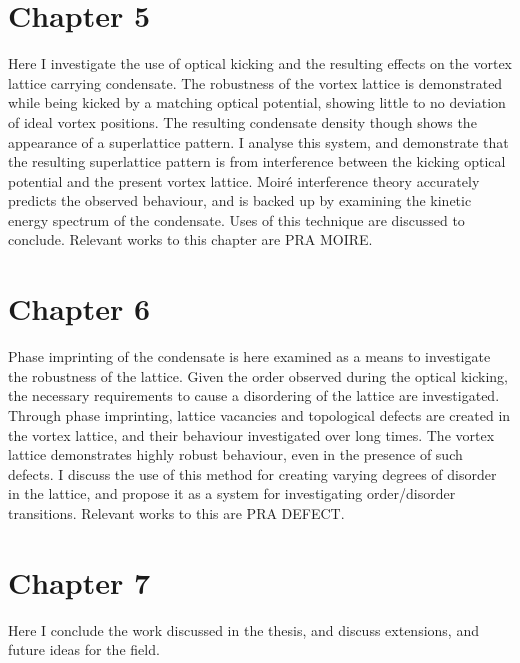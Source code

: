 \section{Chapter 5}
Here I investigate the use of optical kicking and the resulting effects on the vortex lattice carrying condensate. The robustness of the vortex lattice is demonstrated while being kicked by a matching optical potential, showing little to no deviation of ideal vortex positions. The resulting condensate density though shows the appearance of a superlattice pattern. I analyse this system, and demonstrate that the resulting superlattice pattern is from interference between the kicking optical potential and the present vortex lattice. Moir\'e interference theory accurately predicts the observed behaviour, and is backed up by examining the kinetic energy spectrum of the condensate. Uses of this technique are discussed to conclude. Relevant works to this chapter are PRA MOIRE.

\section{Chapter 6}
Phase imprinting of the condensate is here examined as a means to investigate the robustness of the lattice. Given the order observed during the optical kicking, the necessary requirements to cause a disordering of the lattice are investigated. Through phase imprinting, lattice vacancies and topological defects are created in the vortex lattice, and their behaviour investigated over long times. The vortex lattice demonstrates highly robust behaviour, even in the presence of such defects. I discuss the use of this method for creating varying degrees of disorder in the lattice, and propose it as a system for investigating order/disorder transitions. Relevant works to this are PRA DEFECT.

\section{Chapter 7}
Here I conclude the work discussed in the thesis, and discuss extensions, and future ideas for the field.
